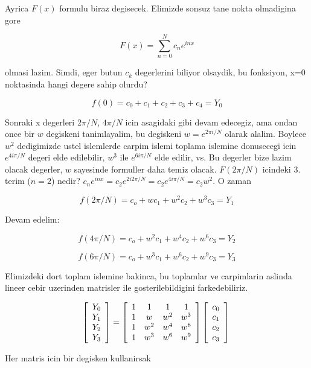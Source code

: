 \documentclass[12pt,fleqn]{article}
\begin{document}
Ayrica $F(x)$ formulu biraz degisecek. Elimizde sonsuz tane nokta olmadigina gore

\[ F(x) = \sum_{n=0}^{N} c_ne^{inx} \]

olmasi lazim. Simdi, eger butun $c_k$ degerlerini biliyor olsaydik, bu
fonksiyon, x=0 noktasinda hangi degere sahip olurdu?

\[ f(0) = c_0 + c_1 + c_2 + c_3 + c_4 = Y_0 \]

Sonraki x degerleri $2\pi/N$, $4\pi/N$ icin asagidaki gibi devam edecegiz, ama
ondan once bir $w$ degiskeni tanimlayalim, bu degiskeni $w=e^{2\pi i/N}$ olarak
alalim. Boylece $w^2$ dedigimizde ustel islemlerde carpim islemi toplama
islemine donusecegi icin $e^{4i\pi/N}$ degeri elde edilebilir, $w^3$ ile
$e^{6i\pi/N}$ elde edilir, vs. Bu degerler bize lazim olacak degerler, $w$
sayesinde formuller daha temiz olacak. $F(2\pi/N)$ icindeki 3. terim ($n=2$)
nedir?  $c_ne^{inx} = c_2e^{2i2\pi/N} = c_2e^{4i\pi/N} = c_2w^2$. O zaman

\[ f(2\pi/N) = c_o + wc_1 + w^2c_2 + w^3c_3 = Y_1 \]

Devam edelim:

\[ f(4\pi/N) = c_o + w^2c_1 + w^4c_2 + w^6c_3 = Y_2  \]

\[ f(6\pi/N) = c_o + w^3c_1 + w^6c_2 + w^9c_3 = Y_3  \]

Elimizdeki dort toplam islemine bakinca, bu toplamlar ve carpimlarin aslinda
lineer cebir uzerinden matrisler ile gosterilebildigini farkedebiliriz. 

\[  
\left[ \begin{array}{c}
    Y_0 \\
    Y_1 \\
    Y_2 \\
    Y_3
\end{array} \right]
=
\left[ \begin{array}{cccc}
    1 & 1 & 1 & 1 \\
    1 & w & w^2 & w^3  \\
    1 & w^2 & w^4 & w^6  \\
    1 & w^3 & w^6 & w^9  
\end{array} \right]
\left[ \begin{array}{c}
    c_0 \\
    c_1 \\
    c_2 \\
    c_3
\end{array} \right] \\
\]

Her matris icin bir degisken kullanirsak
\end{document}
